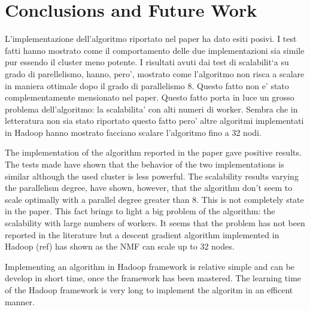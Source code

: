 \section{Conclusions and Future Work}
\label{conclusion}
L'implementazione dell'algoritmo riportato nel paper ha dato esiti posivi. I test fatti hanno mostrato come il comportamento delle due implementazioni sia simile pur essendo il cluster  meno potente. I risultati avuti dai test di scalabilit`a su grado di parellelismo, hanno,  pero',   mostrato come l'algoritmo non risca a scalare in maniera ottimale dopo il grado di parallelismo 8. Questo fatto non e' stato complementamente mensionato nel paper. Questo fatto porta in luce un grosso problema dell'algoritmo: la scalabilita' con alti numeri di worker. Sembra che in letteratura non sia stato riportato questo fatto pero' altre algoritmi implementati in Hadoop hanno mostrato facciano scalare l'algoritmo fino a 32 nodi. 





The implementation of the algorithm reported in the paper gave positive results. The tests made have shown that the behavior of the two implementations is similar although the used cluster is less powerful. The scalability results varying the parallelism degree, have shown, however, that the algorithm don't seem to scale optimally with a parallel degree greater than 8. This is not completely state in the paper. This fact brings to light a big problem of the algorithm: the scalability with large numbers of workers. It seems that the problem has not been reported in the literature but a descent gradient algorithm implemented in Hadoop (ref) has shown as the NMF can scale up to 32 nodes.


Implementing an algorithm in Hadoop framework is relative simple and can be develop in short time, once the framework has been mastered. The learning time of the Hadoop framework is very long to implement the algoritm in an efficent manner.